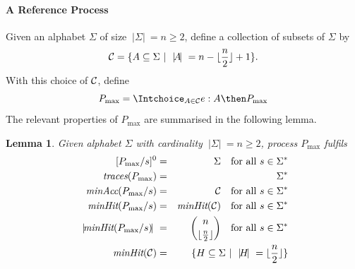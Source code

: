 \documentclass[3p,times]{elsarticle}
\newcommand{\trc}{\text{\it traces}}
\newcommand{\minaccs}{\text{\it minAcc}}
\newcommand{\minhits}{\text{\it minHit}}
\newcommand{\card}[1]{{~|\! #1\!|~}}
\newcommand{\pmax}{P_\text{max}}
\newtheorem{lemma}{Lemma}
\begin{document}
\paragraph{A Reference Process} Given an alphabet $\Sigma$ of size $\card{\Sigma} =
n\ge 2$, define a collection of subsets of $\Sigma$ by
\begin{equation}\label{eq:defC}
  {\cal C} = \{ A\subseteq\Sigma~|~\card{A} = n - \lfloor\frac{n}{2}\rfloor + 1 \}.
\end{equation}
%
With this choice of ${\cal C}$, define
\begin{equation}\label{eq:pmax}
  \pmax = \Intchoice_{A\in{\cal C}} e:A\then \pmax
\end{equation}
%
The relevant properties of $\pmax$ are summarised in the following lemma.
%
\begin{lemma}\label{lemma:pmax}
  Given alphabet $\Sigma$ with cardinality $\card{\Sigma} = n\ge 2$,
  process $\pmax$ fulfils
  \begin{eqnarray}
  {}[\pmax/s]^0 & = & \Sigma \quad\text{for all $s\in \Sigma^*$}
  \label{eq:pmaxa}
  \\
  \trc(\pmax) & = & \Sigma^*
  \label{eq:pmaxb}
  \\
  \minaccs(\pmax/s) & = & {\cal C} \quad\text{for all $s\in \Sigma^*$}
  \label{eq:pmaxc}
  \\
  \minhits(\pmax/s) & = & \minhits({\cal C}) \quad\text{for all $s\in \Sigma^*$}
  \label{eq:pmaxe}
  \\
  \card{\minhits(\pmax/s)} & = & \binom{n}{\lfloor\frac{n}{2}\rfloor}
  \quad \text{for all $s\in \Sigma^*$}
  \label{eq:pmaxd}
  \\
  \minhits({\cal C})  & = & \{ H\subseteq \Sigma~|~\card{H} = \lfloor\frac{n}{2}\rfloor\}
  \label{eq:pmaxf}
  \end{eqnarray}
\end{lemma}
\end{document}
